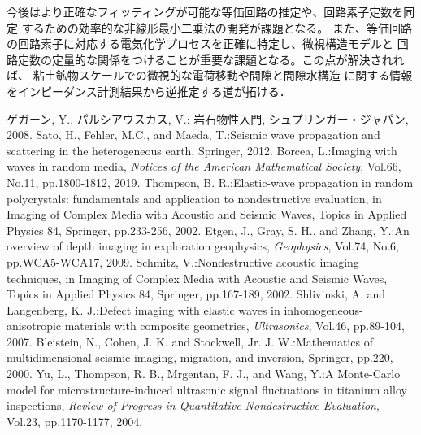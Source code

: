 \documentclass{jsce}
\begin{document}
今後はより正確なフィッティングが可能な等価回路の推定や、回路素子定数を同定
するための効率的な非線形最小二乗法の開発が課題となる。
また、等価回路の回路素子に対応する電気化学プロセスを正確に特定し、微視構造モデルと
回路定数の定量的な関係をつけることが重要な課題となる。この点が解決されれば、
粘土鉱物スケールでの微視的な電荷移動や間隙と間隙水構造
に関する情報をインピーダンス計測結果から逆推定する道が拓ける．
\begin{thebibliography}{99}
\begin{spacing}{1.175}
	ゲガーン, Y., パルシアウスカス, V.: 
	岩石物性入門, シュプリンガー・ジャパン, 2008. 
	Sato, H., Fehler, M.C., and Maeda, T.:Seismic wave propagation and scattering in the heterogeneous earth, 
	Springer, 2012.
	Borcea, L.:Imaging with waves in random media, {\it Notices of the American Mathematical Society}, Vol.66, No.11, 
	pp.1800-1812, 2019.
	Thompson, B. R.:Elastic-wave propagation in random polycrystals: 
	fundamentals and application to nondestructive evaluation, 
	in Imaging of Complex Media with Acoustic and Seismic Waves, Topics in Applied Physics 84, Springer, pp.233-256, 2002.
	Etgen, J., Gray, S. H., and Zhang, Y.:An overview of depth imaging in exploration geophysics, 
	{\it Geophysics}, Vol.74, No.6, pp.WCA5-WCA17, 2009.
	Schmitz, V.:Nondestructive acoustic imaging techniques, in Imaging of Complex Media with Acoustic and Seismic Waves, 
	Topics in Applied Physics 84, Springer, pp.167-189, 2002.
	Shlivinski, A. and Langenberg, K. J.:Defect imaging with elastic waves in inhomogeneous-anisotropic materials with composite geometries, {\it Ultrasonics}, Vol.46, pp.89-104, 2007.
	Bleistein, N., Cohen, J. K. and Stockwell, Jr. J. W.:Mathematics of multidimensional seismic imaging, migration, and inversion, Springer, pp.220, 2000.
	Yu, L., Thompson, R. B., Mrgentan, F. J., and Wang, Y.:A Monte-Carlo model for microstructure-induced ultrasonic signal fluctuations in titanium alloy inspections,
	{\it Review of Progress in Quantitative Nondestructive Evaluation}, Vol.23, pp.1170-1177, 2004.

\end{spacing}
\end{thebibliography}
\end{document}
